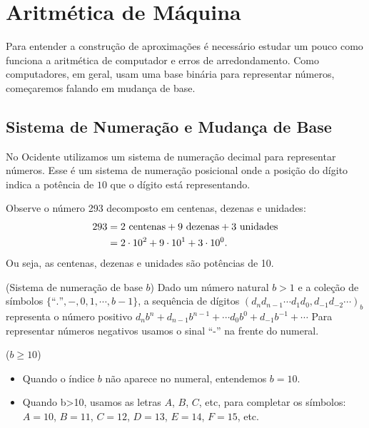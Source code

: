 \chapter{Aritmética de Máquina}
Para entender a construção de aproximações é necessário estudar um pouco como funciona a aritmética de computador e erros de arredondamento. Como computadores, em geral, usam uma base binária para representar números, começaremos falando em mudança de base.

\section{Sistema de Numeração e Mudança de Base}
No Ocidente utilizamos um sistema de numeração decimal para representar números. Esse é um sistema de numeração posicional onde a posição do dígito indica a potência de $10$ que o dígito está representando.

\begin{ex}
  Observe o número 293 decomposto em centenas, dezenas e unidades:
  \begin{align*}
    293 &= 2\ \hbox{centenas}+9\ \hbox{dezenas}+3\ \hbox{unidades}\\
        &= 2\cdot 10^2+9\cdot 10^1+3\cdot 10^0.
  \end{align*}
  Ou seja, as centenas, dezenas e unidades são potências de 10.
\end{ex}

\begin{defn}(Sistema de numeração de base $b$)
Dado um número natural $b>1$ e  a coleção de símbolos $\{\text{``.''}, - ,0, 1, \cdots, b-1\}$, a sequência de dígitos
$
(d_nd_{n-1}\cdots d_1d_0,d_{-1}d_{-2}\cdots)_b
$
representa o número positivo
$
d_nb^n+d_{n-1}b^{n-1}+\cdots d_0b^0+d_{-1}b^{-1}+\cdots
$
Para representar números negativos usamos o sinal ``-'' na frente do numeral.
\end{defn}

\begin{obs}($b\geq 10$)

\begin{itemize}
\item Quando o índice $b$ não aparece no numeral, entendemos $b=10$.
\item Quando b>10, usamos as letras $A$, $B$, $C$, etc, para completar os símbolos: $A=10$, $B=11$, $C=12$, $D=13$, $E=14$, $F=15$, etc.
\end{itemize}
\end{obs}


